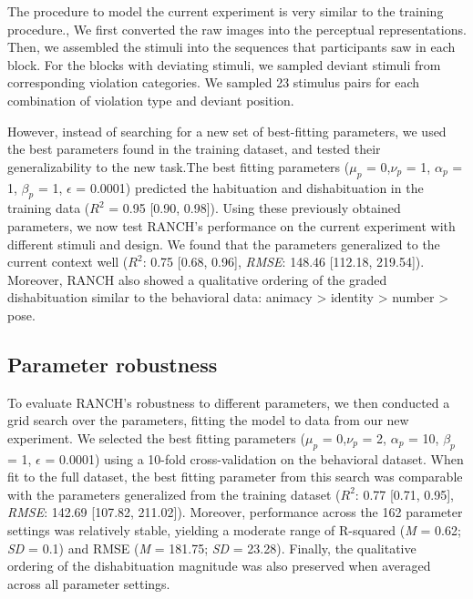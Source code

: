 \documentclass[10pt, letterpaper]{article}
\begin{document}
The procedure to model the current experiment is very similar to the
training procedure., We first converted the raw images into the
perceptual representations. Then, we assembled the stimuli into the
sequences that participants saw in each block. For the blocks with
deviating stimuli, we sampled deviant stimuli from corresponding
violation categories. We sampled 23 stimulus pairs for each combination
of violation type and deviant position.

However, instead of searching for a new set of best-fitting parameters,
we used the best parameters found in the training dataset, and tested
their generalizability to the new task.The best fitting parameters
(\(\mu_{p}\) = 0,\(\nu_{p}\) = 1, \(\alpha_{p}\) = 1, \(\beta_{p}\) = 1,
\(\epsilon\) = 0.0001) predicted the habituation and dishabituation in
the training data (\(R^2\) = 0.95 {[}0.90, 0.98{]}). Using these
previously obtained parameters, we now test RANCH's performance on the
current experiment with different stimuli and design. We found that the
parameters generalized to the current context well (\(R^2\): 0.75
{[}0.68, 0.96{]}, \emph{RMSE}: 148.46 {[}112.18, 219.54{]}). Moreover,
RANCH also showed a qualitative ordering of the graded dishabituation
similar to the behavioral data: animacy \textgreater{} identity
\textgreater{} number \textgreater{} pose.

\hypertarget{parameter-robustness}{%
\subsection{Parameter robustness}\label{parameter-robustness}}

To evaluate RANCH's robustness to different parameters, we then
conducted a grid search over the parameters, fitting the model to data
from our new experiment. We selected the best fitting parameters
(\(\mu_{p}\) = 0,\(\nu_{p}\) = 2, \(\alpha_{p}\) = 10, \(\beta_{p}\) =
1, \(\epsilon\) = 0.0001) using a 10-fold cross-validation on the
behavioral dataset. When fit to the full dataset, the best fitting
parameter from this search was comparable with the parameters
generalized from the training dataset (\(R^2\): 0.77 {[}0.71, 0.95{]},
\emph{RMSE}: 142.69 {[}107.82, 211.02{]}). Moreover, performance across
the 162 parameter settings was relatively stable, yielding a moderate
range of R-squared (\emph{M} = 0.62; \emph{SD} = 0.1) and RMSE (\emph{M}
= 181.75; \emph{SD} = 23.28). Finally, the qualitative ordering of the
dishabituation magnitude was also preserved when averaged across all
parameter settings.
\end{document}
